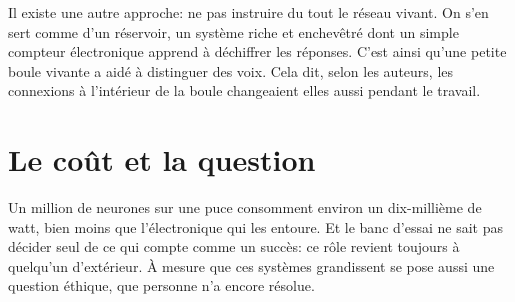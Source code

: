 Il existe une autre approche: ne pas instruire du tout le réseau vivant. On s'en sert comme d'un \og réservoir\fg{}, un système riche et enchevêtré dont un simple compteur électronique apprend à déchiffrer les réponses. C'est ainsi qu'une petite boule vivante a aidé à distinguer des voix. Cela dit, selon les auteurs, les connexions à l'intérieur de la boule changeaient elles aussi pendant le travail.

\section*{Le coût et la question}

Un million de neurones sur une puce consomment environ un dix-millième de watt, bien moins que l'électronique qui les entoure. Et le banc d'essai ne sait pas décider seul de ce qui compte comme un succès: ce rôle revient toujours à quelqu'un d'extérieur. À mesure que ces systèmes grandissent se pose aussi une question éthique, que personne n'a encore résolue.

